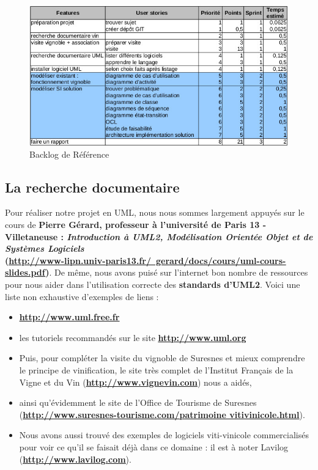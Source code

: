 \documentclass[a4paper, titlepage]{report}
\begin{document}
\begin{figure}[!h]
\centering
\includegraphics{Images/GestionProjet.jpg}
\caption{Backlog de Référence}
\end{figure}

\subsection{La recherche documentaire}

Pour réaliser notre projet en UML, nous nous sommes largement appuyés
sur le cours de \textbf{Pierre Gérard, professeur à l'université de
Paris 13 - Villetaneuse : \emph{Introduction à UML2, Modélisation
Orientée Objet et de Systèmes Logiciels}\\
(\href{http://www-lipn.univ-paris13.fr/~gerard/docs/cours/uml-cours-slides.pdf}{\textbf{\underline{http://www-lipn.univ-paris13.fr/~gerard/docs/cours/uml-cours-slides.pdf}}})}.
De même, nous avons puisé sur l'internet bon nombre de ressources pour
nous aider dans l'utilisation correcte des \textbf{standards d'UML2}.
Voici une liste non exhaustive d'exemples de liens : 
\begin{itemize}
\item \href{http://www.uml.free.fr}{\textbf{\underline{http://www.uml.free.fr}}}
\item les tutoriels recommandés sur le site
\href{http://www.uml.org}{\textbf{\underline{http://www.uml.org}}}
\item Puis, pour compléter la visite du vignoble de
Suresnes et mieux comprendre le principe de vinification, le site très
complet de l'Institut Français de la Vigne et du Vin
(\href{http://www.vignevin.com}{\textbf{\underline{http://www.vignevin.com}}}) nous a aidés,
\item ainsi qu'évidemment le site de l'Office de Tourisme de Suresnes\\
(\href{http://www.suresnes-tourisme.com/patrimoine-vitivinicole.html}{\textbf{\underline{http://www.suresnes-tourisme.com/patrimoine vitivinicole.html}}}).
\item Nous avons aussi trouvé des exemples de logiciels viti-vinicole
commercialisés pour voir ce qu'il se faisait déjà dans ce domaine : il
est à noter Lavilog (\href{http://www.lavilog.com}{\textbf{\underline{http://www.lavilog.com}}}).
\end{itemize}
\end{document}
